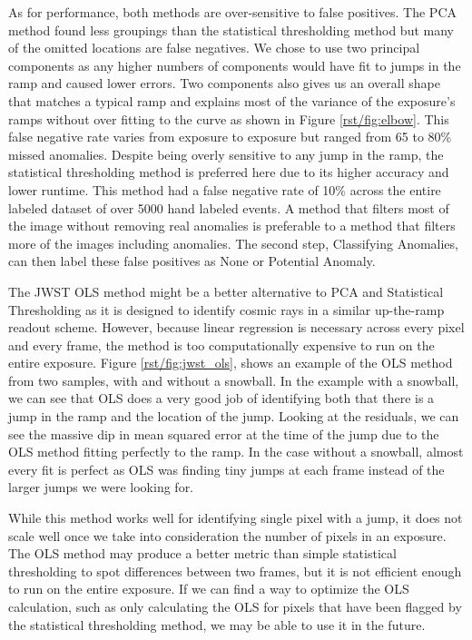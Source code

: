 As for performance, both methods are over-sensitive to false positives.
The PCA method found less groupings than the statistical thresholding method but many of the omitted locations are false negatives.
We chose to use two principal components as any higher numbers of components would have fit to jumps in the ramp and caused lower errors.
Two components also gives us an overall shape that matches a typical ramp and explains most of the variance of the exposure's ramps without over fitting to the curve as shown in Figure \ref{rst/fig:elbow}.
This false negative rate varies from exposure to exposure but ranged from 65 to 80\% missed anomalies. 
Despite being overly sensitive to any jump in the ramp, the statistical thresholding method is preferred here due to its higher accuracy and lower runtime.
This method had a false negative rate of 10\% across the entire labeled dataset of over 5000 hand labeled events. 
A method that filters most of the image without removing real anomalies is preferable to a method that filters more of the images including anomalies. The second step, Classifying Anomalies, can then label these false positives as None or Potential Anomaly. 

The JWST OLS method might be a better alternative to PCA and Statistical Thresholding as it is designed to identify cosmic rays in a similar up-the-ramp readout scheme.
However, because linear regression is necessary across every pixel and every frame, the method is too computationally expensive to run on the entire exposure.
Figure \ref{rst/fig:jwst_ols}, shows an example of the OLS method from two samples, with and without a snowball.
In the example with a snowball, we can see that OLS does a very good job of identifying both that there is a jump in the ramp and the location of the jump.
Looking at the residuals, we can see the massive dip in mean squared error at the time of the jump due to the OLS method fitting perfectly to the ramp.
In the case without a snowball, almost every fit is perfect as OLS was finding tiny jumps at each frame instead of the larger jumps we were looking for.

While this method works well for identifying single pixel with a jump, it does not scale well once we take into consideration the number of pixels in an exposure.
The OLS method may produce a better metric than simple statistical thresholding to spot differences between two frames, but it is not efficient enough to run on the entire exposure.
If we can find a way to optimize the OLS calculation, such as only calculating the OLS for pixels that have been flagged by the statistical thresholding method, we may be able to use it in the future.

